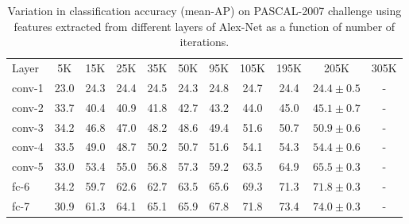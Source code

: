 \setlength{\tabcolsep}{4pt}
\begin{table}[t!]
\begin{center}
\caption{Variation in classification accuracy (mean-AP) on PASCAL-2007 challenge using features extracted from different layers of Alex-Net as a function of number of iterations.}
\label{table:det-traj-classify}
\begin{tabular}{lcccccccccc}
\hline\noalign{\smallskip}
Layer  & 5K & 15K & 25K & 35K & 50K & 95K & 105K & 195K & 205K & 305K \\
\noalign{\smallskip}
\hline
\noalign{\smallskip}
conv-1 & 23.0 & 24.3 & 24.4 & 24.5 & 24.3 & 24.8 & 24.7 & 24.4 & $24.4 \pm 0.5$ & -\\
conv-2 & 33.7 & 40.4 & 40.9 & 41.8 & 42.7 & 43.2 & 44.0 & 45.0 & $45.1 \pm 0.7$ & -\\
conv-3 & 34.2 & 46.8 & 47.0 & 48.2 & 48.6 & 49.4 & 51.6 & 50.7 & $50.9 \pm 0.6$ & -\\
conv-4 & 33.5 & 49.0 & 48.7 & 50.2 & 50.7 & 51.6 & 54.1 & 54.3 & $54.4 \pm 0.6$ & -\\
conv-5 & 33.0 & 53.4 & 55.0 & 56.8 & 57.3 & 59.2 & 63.5 & 64.9 & $65.5 \pm 0.3$ & -\\
fc-6 & 34.2 & 59.7 & 62.6 & 62.7 & 63.5 & 65.6 	& 69.3 & 71.3 & $71.8 \pm 0.3$ & -\\
fc-7 & 30.9 & 61.3 & 64.1 & 65.1 & 65.9 & 67.8 	& 71.8 & 73.4 & $74.0 \pm 0.3$ & -\\
\hline
\end{tabular}
\end{center}
\end{table}
\setlength{\tabcolsep}{1.4pt}

